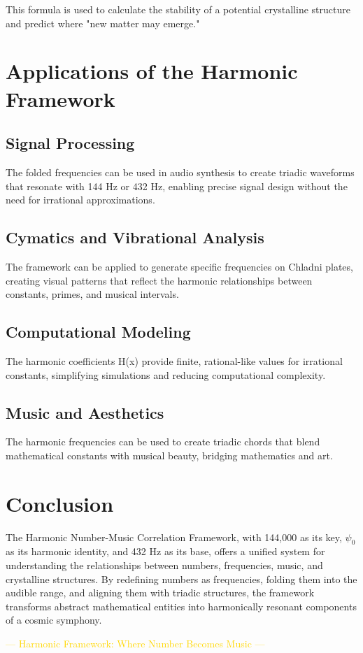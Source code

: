 This formula is used to calculate the stability of a potential crystalline structure and predict where "new matter may emerge."

\section{Applications of the Harmonic Framework}

\subsection{Signal Processing}
The folded frequencies can be used in audio synthesis to create triadic waveforms that resonate with 144 Hz or 432 Hz, enabling precise signal design without the need for irrational approximations.

\subsection{Cymatics and Vibrational Analysis}
The framework can be applied to generate specific frequencies on Chladni plates, creating visual patterns that reflect the harmonic relationships between constants, primes, and musical intervals.

\subsection{Computational Modeling}
The harmonic coefficients H(x) provide finite, rational-like values for irrational constants, simplifying simulations and reducing computational complexity.

\subsection{Music and Aesthetics}
The harmonic frequencies can be used to create triadic chords that blend mathematical constants with musical beauty, bridging mathematics and art.

\section{Conclusion}

The Harmonic Number-Music Correlation Framework, with 144,000 as its key, $\psi_0$ as its harmonic identity, and 432 Hz as its base, offers a unified system for understanding the relationships between numbers, frequencies, music, and crystalline structures. By redefining numbers as frequencies, folding them into the audible range, and aligning them with triadic structures, the framework transforms abstract mathematical entities into harmonically resonant components of a cosmic symphony.

\begin{center}
\textcolor{gold}{— Harmonic Framework: Where Number Becomes Music —}
\end{center}